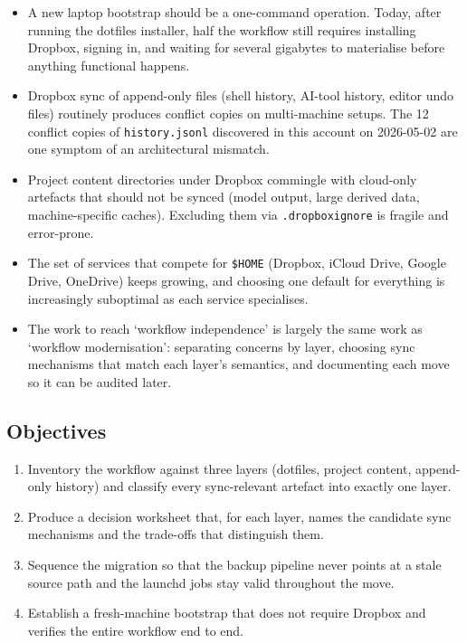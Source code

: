 \documentclass[
  11pt,
  letterpaper,
  DIV=11,
  numbers=noendperiod]{scrartcl}
\providecommand{\tightlist}{%
  \setlength{\itemsep}{0pt}\setlength{\parskip}{0pt}}\usepackage{longtable,booktabs,array}
\begin{document}
\begin{itemize}
\tightlist
\item
  A new laptop bootstrap should be a one-command operation. Today, after
  running the dotfiles installer, half the workflow still requires
  installing Dropbox, signing in, and waiting for several gigabytes to
  materialise before anything functional happens.
\item
  Dropbox sync of append-only files (shell history, AI-tool history,
  editor undo files) routinely produces conflict copies on multi-machine
  setups. The 12 conflict copies of \texttt{history.jsonl} discovered in
  this account on 2026-05-02 are one symptom of an architectural
  mismatch.
\item
  Project content directories under Dropbox commingle with cloud-only
  artefacts that should not be synced (model output, large derived data,
  machine-specific caches). Excluding them via \texttt{.dropboxignore}
  is fragile and error-prone.
\item
  The set of services that compete for \texttt{\$HOME} (Dropbox, iCloud
  Drive, Google Drive, OneDrive) keeps growing, and choosing one default
  for everything is increasingly suboptimal as each service specialises.
\item
  The work to reach `workflow independence' is largely the same work as
  `workflow modernisation': separating concerns by layer, choosing sync
  mechanisms that match each layer's semantics, and documenting each
  move so it can be audited later.
\end{itemize}

\subsection{Objectives}\label{objectives}

\begin{enumerate}
\def\labelenumi{\arabic{enumi}.}
\tightlist
\item
  Inventory the workflow against three layers (dotfiles, project
  content, append-only history) and classify every sync-relevant
  artefact into exactly one layer.
\item
  Produce a decision worksheet that, for each layer, names the candidate
  sync mechanisms and the trade-offs that distinguish them.
\item
  Sequence the migration so that the backup pipeline never points at a
  stale source path and the launchd jobs stay valid throughout the move.
\item
  Establish a fresh-machine bootstrap that does not require Dropbox and
  verifies the entire workflow end to end.
\end{enumerate}
\end{document}
